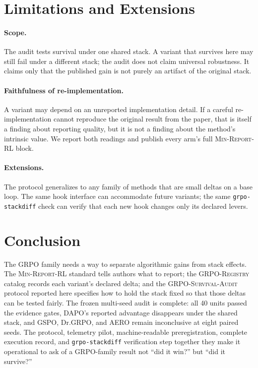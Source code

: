 \documentclass[11pt]{article}
\newcommand{\minreport}{\textsc{Min-Report-RL}}
\newcommand{\grpo}{\textsc{GRPO}}
\newcommand{\audit}{\textsc{GRPO-Survival-Audit}}
\newcommand{\grpoReg}{\textsc{GRPO-Registry}}
\begin{document}
\section{Limitations and Extensions}


\paragraph{Scope.} The audit tests survival under one shared stack. A variant
that survives here may still fail under a different stack; the audit does not
claim universal robustness. It claims only that the published gain is not
purely an artifact of the original stack.

\paragraph{Faithfulness of re-implementation.} A variant may depend on an
unreported implementation detail. If a careful re-implementation cannot
reproduce the original result from the paper, that is itself a finding about
reporting quality, but it is not a finding about the method's intrinsic value.
We report both readings and publish every arm's full \minreport{} block.

\paragraph{Extensions.} The protocol generalizes to any family of methods that
are small deltas on a base loop. The same hook interface can accommodate
future variants; the same \texttt{grpo-stackdiff} check can verify that each
new hook changes only its declared levers.

\section{Conclusion}


The \grpo{} family needs a way to separate algorithmic gains from stack
effects. The \minreport{} standard tells authors what to report; the
\grpoReg{} catalog records each variant's declared delta; and the \audit{}
protocol reported here specifies how to hold the stack fixed so that those
deltas can be tested fairly. The frozen multi-seed audit is complete: all 40
units passed the evidence gates, DAPO's reported advantage disappears under
the shared stack, and GSPO, Dr.\grpo{}, and AERO remain inconclusive at eight
paired seeds. The protocol, telemetry pilot, machine-readable preregistration,
complete execution record, and \texttt{grpo-stackdiff} verification step
together
they make it operational to ask of a GRPO-family result not
``did it win?'' but ``did it survive?''



\end{document}
